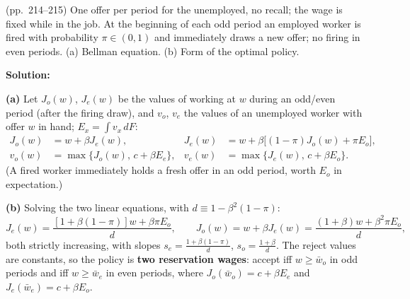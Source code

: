 \documentclass[12pt, letterpaper]{article}
\newcommand{\wb}{\bar w}
\begin{document}
\begin{tcolorbox}[evenbox,title={Exercise 6.16 \quad Seasons, II}]
\begin{tcolorbox}[questionbox]
(pp.~214--215) One offer per period for the unemployed, no recall; the wage is fixed while in the job. At the
beginning of each odd period an employed worker is fired with probability $\pi\in(0,1)$ and immediately
draws a new offer; no firing in even periods. (a) Bellman equation. (b) Form of the optimal policy.
\end{tcolorbox}

\textbf{Solution:}

\textbf{(a)} Let $J_o(w)$, $J_e(w)$ be the values of working at $w$ during an odd/even period (after the firing
draw), and $v_o$, $v_e$ the values of an unemployed worker with offer $w$ in hand; $E_x=\int v_x\,dF$:
\[
\boxed{\begin{aligned}
J_o(w)&=w+\beta J_e(w), & J_e(w)&=w+\beta\big[(1-\pi)J_o(w)+\pi E_o\big],\\
v_o(w)&=\max\{J_o(w),\,c+\beta E_e\}, & v_e(w)&=\max\{J_e(w),\,c+\beta E_o\}.
\end{aligned}}
\]
(A fired worker immediately holds a fresh offer in an odd period, worth $E_o$ in expectation.)

\textbf{(b)} Solving the two linear equations, with $d\equiv1-\beta^2(1-\pi)$:
\[
J_e(w)=\frac{[1+\beta(1-\pi)]w+\beta\pi E_o}{d},\qquad J_o(w)=w+\beta J_e(w)=\frac{(1+\beta)w+\beta^2\pi E_o}{d},
\]
both strictly increasing, with slopes $s_e=\frac{1+\beta(1-\pi)}{d}$, $s_o=\frac{1+\beta}{d}$. The reject values are
constants, so the policy is \textbf{two reservation wages}: accept iff $w\ge\wb_o$ in odd periods and iff
$w\ge\wb_e$ in even periods, where $J_o(\wb_o)=c+\beta E_e$ and $J_e(\wb_e)=c+\beta E_o$.


\end{tcolorbox}
\end{document}

